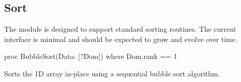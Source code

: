 \subsection{Sort}
\label{Sort}

The  module is designed to support standard sorting
routines.  The current interface is minimal and should be expected to
grow and evolve over time.

\begin{protohead}
proc BubbleSort(Data: [?Dom]) where Dom.rank == 1
\end{protohead}
\begin{protobody}
Sorts the 1D array  in-place using a sequential bubble sort
algorithm.
\end{protobody}


